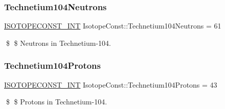 \subsubsection{\texorpdfstring{Technetium104\+Neutrons}{Technetium104Neutrons}}
{\footnotesize\ttfamily \mbox{\hyperlink{group___isotope_const-_macros_ga5f18360b3e99483a35c32d789e62621c}{I\+S\+O\+T\+O\+P\+E\+C\+O\+N\+S\+T\+\_\+\+I\+NT}} Isotope\+Const\+::\+Technetium104\+Neutrons = 61}

\$ \$ Neutrons in Technetium-\/104. \mbox{\label{group___isotope_const-_technetium-_tc104_ga78c7ccdca2e0137dce9ca34883ce6acb}} 
\subsubsection{\texorpdfstring{Technetium104\+Protons}{Technetium104Protons}}
{\footnotesize\ttfamily \mbox{\hyperlink{group___isotope_const-_macros_ga5f18360b3e99483a35c32d789e62621c}{I\+S\+O\+T\+O\+P\+E\+C\+O\+N\+S\+T\+\_\+\+I\+NT}} Isotope\+Const\+::\+Technetium104\+Protons = 43}

\$ \$ Protons in Technetium-\/104. 